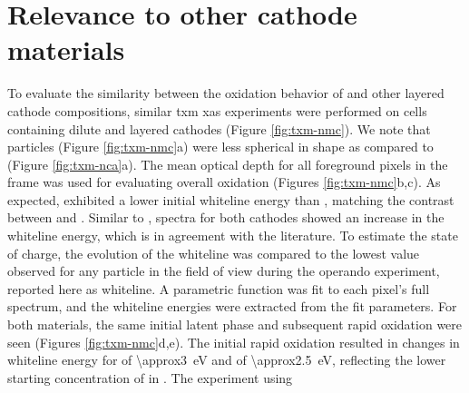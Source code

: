 \documentclass{article}
\begin{document}
\newpage %
\section{Relevance to other cathode materials}


To evaluate the similarity between the oxidation behavior of \nca{}
and other layered cathode compositions, similar \gls{txm} \gls{xas}
experiments were performed on cells containing dilute \nmc[333]{} and
\nmc[532]{} layered cathodes (Figure \ref{fig:txm-nmc}). We note that
\nmc{} particles (Figure \ref{fig:txm-nmc}a) were less spherical in
shape as compared to \nca{} (Figure \ref{fig:txm-nca}a). The mean
optical depth for all foreground pixels in the frame was used for
evaluating overall oxidation (Figures \ref{fig:txm-nmc}b,c). As
expected, \nmc[333]{} exhibited a lower initial whiteline energy than
\nca{}\cite{deb2005,muto2009}, matching the contrast between
 and . Similar to \nca{}, spectra for both
\nmc{} cathodes showed an increase in the whiteline energy, which is
in agreement with the literature\cite{deb2005}. To estimate the state
of charge, the evolution of the whiteline was compared to the lowest
value observed for any particle in the field of view during the
operando experiment, reported here as \textDelta{}whiteline. A
parametric function was fit to each pixel's full spectrum, and the
whiteline energies were extracted from the fit parameters.  For both \nmc{} materials, the same
initial latent phase and subsequent rapid oxidation were seen (Figures
\ref{fig:txm-nmc}d,e). The initial rapid  oxidation resulted in
changes in whiteline energy for \nmc[333]{} of
\SI{\approx3}{\electronvolt} and \nmc[532]{} of
\SI{\approx2.5}{\electronvolt}, reflecting the lower starting
concentration of  in \nmc[333]{}. The experiment using
\end{document}
